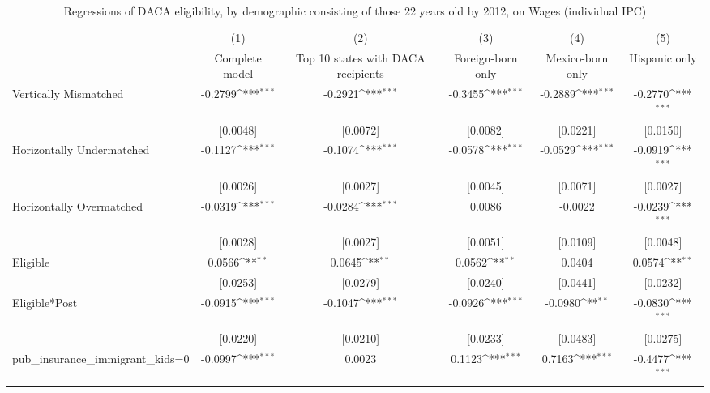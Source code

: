 \begin{table}[htbp]\centering
\def\sym#1{\ifmmode^{#1}\else\(^{#1}\)\fi}
\caption{Regressions of DACA eligibility, by demographic consisting of those 22 years old by 2012, on Wages (individual IPC)}
\begin{tabular}{l*{5}{c}}
\toprule
                    &\multicolumn{1}{c}{(1)}         &\multicolumn{1}{c}{(2)}         &\multicolumn{1}{c}{(3)}         &\multicolumn{1}{c}{(4)}         &\multicolumn{1}{c}{(5)}         \\
                    &Complete model         &Top 10 states with DACA recipients         &Foreign-born only         &Mexico-born only         &Hispanic only         \\
\midrule
Vertically Mismatched&     -0.2799\sym{***}&     -0.2921\sym{***}&     -0.3455\sym{***}&     -0.2889\sym{***}&     -0.2770\sym{***}\\
                    &    [0.0048]         &    [0.0072]         &    [0.0082]         &    [0.0221]         &    [0.0150]         \\
\addlinespace
Horizontally Undermatched&     -0.1127\sym{***}&     -0.1074\sym{***}&     -0.0578\sym{***}&     -0.0529\sym{***}&     -0.0919\sym{***}\\
                    &    [0.0026]         &    [0.0027]         &    [0.0045]         &    [0.0071]         &    [0.0027]         \\
\addlinespace
Horizontally Overmatched&     -0.0319\sym{***}&     -0.0284\sym{***}&      0.0086         &     -0.0022         &     -0.0239\sym{***}\\
                    &    [0.0028]         &    [0.0027]         &    [0.0051]         &    [0.0109]         &    [0.0048]         \\
\addlinespace
Eligible            &      0.0566\sym{**} &      0.0645\sym{**} &      0.0562\sym{**} &      0.0404         &      0.0574\sym{**} \\
                    &    [0.0253]         &    [0.0279]         &    [0.0240]         &    [0.0441]         &    [0.0232]         \\
\addlinespace
Eligible*Post       &     -0.0915\sym{***}&     -0.1047\sym{***}&     -0.0926\sym{***}&     -0.0980\sym{**} &     -0.0830\sym{***}\\
                    &    [0.0220]         &    [0.0210]         &    [0.0233]         &    [0.0483]         &    [0.0275]         \\
\addlinespace
pub\_insurance\_immigrant\_kids=0&     -0.0997\sym{***}&      0.0023         &      0.1123\sym{***}&      0.7163\sym{***}&     -0.4477\sym{***}\\

\end{tabular}
\end{table}
